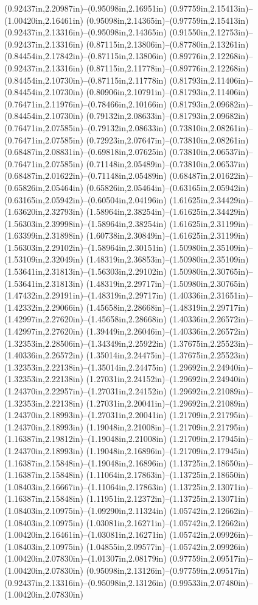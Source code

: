 (0.92437in,2.20987in)--(0.95098in,2.16951in) (0.97759in,2.15413in)--(1.00420in,2.16461in) (0.95098in,2.14365in)--(0.97759in,2.15413in) (0.92437in,2.13316in)--(0.95098in,2.14365in) (0.91550in,2.12753in)--(0.92437in,2.13316in) (0.87115in,2.13806in)--(0.87780in,2.13261in) (0.84454in,2.17842in)--(0.87115in,2.13806in) (0.89776in,2.12268in)--(0.92437in,2.13316in) (0.87115in,2.11778in)--(0.89776in,2.12268in) (0.84454in,2.10730in)--(0.87115in,2.11778in) (0.81793in,2.11406in)--(0.84454in,2.10730in) (0.80906in,2.10791in)--(0.81793in,2.11406in) (0.76471in,2.11976in)--(0.78466in,2.10166in) (0.81793in,2.09682in)--(0.84454in,2.10730in) (0.79132in,2.08633in)--(0.81793in,2.09682in) (0.76471in,2.07585in)--(0.79132in,2.08633in) (0.73810in,2.08261in)--(0.76471in,2.07585in) (0.72923in,2.07647in)--(0.73810in,2.08261in) (0.68487in,2.08831in)--(0.69818in,2.07625in) (0.73810in,2.06537in)--(0.76471in,2.07585in) (0.71148in,2.05489in)--(0.73810in,2.06537in) (0.68487in,2.01622in)--(0.71148in,2.05489in) (0.68487in,2.01622in)--(0.65826in,2.05464in) (0.65826in,2.05464in)--(0.63165in,2.05942in) (0.63165in,2.05942in)--(0.60504in,2.04196in) (1.61625in,2.34429in)--(1.63620in,2.32793in) (1.58964in,2.38254in)--(1.61625in,2.34429in) (1.56303in,2.39998in)--(1.58964in,2.38254in) (1.61625in,2.31199in)--(1.63399in,2.31898in) (1.60738in,2.30849in)--(1.61625in,2.31199in) (1.56303in,2.29102in)--(1.58964in,2.30151in) (1.50980in,2.35109in)--(1.53109in,2.32049in) (1.48319in,2.36853in)--(1.50980in,2.35109in) (1.53641in,2.31813in)--(1.56303in,2.29102in) (1.50980in,2.30765in)--(1.53641in,2.31813in) (1.48319in,2.29717in)--(1.50980in,2.30765in) (1.47432in,2.29191in)--(1.48319in,2.29717in) (1.40336in,2.31651in)--(1.42332in,2.29066in) (1.45658in,2.28668in)--(1.48319in,2.29717in) (1.42997in,2.27620in)--(1.45658in,2.28668in) (1.40336in,2.26572in)--(1.42997in,2.27620in) (1.39449in,2.26046in)--(1.40336in,2.26572in) (1.32353in,2.28506in)--(1.34349in,2.25922in) (1.37675in,2.25523in)--(1.40336in,2.26572in) (1.35014in,2.24475in)--(1.37675in,2.25523in) (1.32353in,2.22138in)--(1.35014in,2.24475in) (1.29692in,2.24940in)--(1.32353in,2.22138in) (1.27031in,2.24152in)--(1.29692in,2.24940in) (1.24370in,2.22957in)--(1.27031in,2.24152in) (1.29692in,2.21089in)--(1.32353in,2.22138in) (1.27031in,2.20041in)--(1.29692in,2.21089in) (1.24370in,2.18993in)--(1.27031in,2.20041in) (1.21709in,2.21795in)--(1.24370in,2.18993in) (1.19048in,2.21008in)--(1.21709in,2.21795in) (1.16387in,2.19812in)--(1.19048in,2.21008in) (1.21709in,2.17945in)--(1.24370in,2.18993in) (1.19048in,2.16896in)--(1.21709in,2.17945in) (1.16387in,2.15848in)--(1.19048in,2.16896in) (1.13725in,2.18650in)--(1.16387in,2.15848in) (1.11064in,2.17863in)--(1.13725in,2.18650in) (1.08403in,2.16667in)--(1.11064in,2.17863in) (1.13725in,2.13071in)--(1.16387in,2.15848in) (1.11951in,2.12372in)--(1.13725in,2.13071in) (1.08403in,2.10975in)--(1.09290in,2.11324in) (1.05742in,2.12662in)--(1.08403in,2.10975in) (1.03081in,2.16271in)--(1.05742in,2.12662in) (1.00420in,2.16461in)--(1.03081in,2.16271in) (1.05742in,2.09926in)--(1.08403in,2.10975in) (1.04855in,2.09577in)--(1.05742in,2.09926in) (1.00420in,2.07830in)--(1.01307in,2.08179in) (0.97759in,2.09517in)--(1.00420in,2.07830in) (0.95098in,2.13126in)--(0.97759in,2.09517in) (0.92437in,2.13316in)--(0.95098in,2.13126in) (0.99533in,2.07480in)--(1.00420in,2.07830in) 